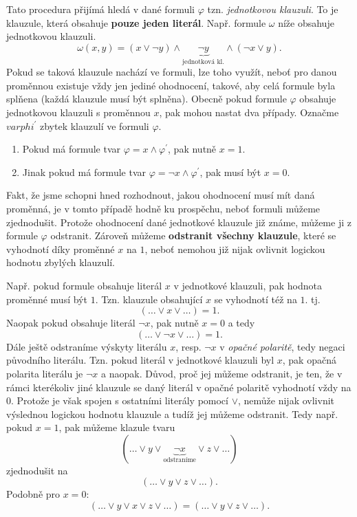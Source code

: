 Tato procedura přijímá hledá v dané formuli $\varphi$ tzn. \emph{jednotkovou klauzuli}. To je klauzule, která obsahuje \textbf{pouze jeden literál}. Např. formule $\omega$ níže obsahuje jednotkovou klauzuli.
\[\omega(x,y)=(x\lor\neg y)\land \underbrace{\neg y}_{\text{jednotková kl.}}\land (\neg x\lor y).\]
Pokud se taková klauzule nachází ve formuli, lze toho využít, neboť pro danou proměnnou existuje vždy jen jediné ohodnocení, takové, aby celá formule byla splňena (každá klauzule musí být splněna). Obecně pokud formule $\varphi$ obsahuje jednotkovou klauzuli s proměnnou $x$, pak mohou nastat dva případy. Označme $varphi^\prime$ zbytek klauzulí ve formuli $\varphi$.
\begin{enumerate}
    \item Pokud má formule tvar $\varphi=x\land\varphi^\prime$, pak nutně $x=1$.
    \item Jinak pokud má formule tvar $\varphi=\neg x\land\varphi^\prime$, pak musí být $x=0$.
\end{enumerate}
Fakt, že jsme schopni hned rozhodnout, jakou ohodnocení musí mít daná proměnná, je v tomto případě hodně ku prospěchu, neboť formuli můžeme zjednodušit. Protože ohodnocení dané jednotkové klauzule již známe, můžeme ji z formule $\varphi$ odstranit. Zároveň můžeme \textbf{odstranit všechny klauzule}, které se vyhodnotí díky proměnné $x$ na $1$, neboť nemohou již nijak ovlivnit logickou hodnotu zbylých klauzulí.

Např. pokud formule obsahuje literál $x$ v jednotkové klauzuli, pak hodnota proměnné musí být $1$. Tzn. klauzule obsahující $x$ se vyhodnotí též na $1$. tj. 
\[(\dots\lor x\lor\dots)=1.\]
Naopak pokud obsahuje literál $\neg x$, pak nutně $x=0$ a tedy
\[(\dots\lor \neg x\lor\dots)=1.\]
Dále ještě odstraníme výskyty literálu $x$, resp. $\neg x$ v \emph{opačné polaritě}, tedy negaci původního literálu. Tzn. pokud literál v jednotkové klauzuli byl $x$, pak opačná polarita literálu je $\neg x$ a naopak. Důvod, proč jej můžeme odstranit, je ten, že v rámci kterékoliv jiné klauzule se daný literál v opačné polaritě vyhodnotí vždy na $0$. Protože je však spojen s ostatními literály pomocí $\lor$, nemůže nijak ovlivnit výslednou logickou hodnotu klauzule a tudíž jej můžeme odstranit. Tedy např. pokud $x=1$, pak můžeme klazule tvaru
\[(\dots\lor y \lor \underbrace{\neg x}_{\text{odstraníme}} \lor z \lor \dots)\]
zjednodušit na
\[(\dots\lor y \lor z \lor \dots).\]
Podobně pro $x=0$:
\[(\dots\lor y \lor x \lor z \lor \dots)=(\dots\lor y \lor z \lor \dots).\]

